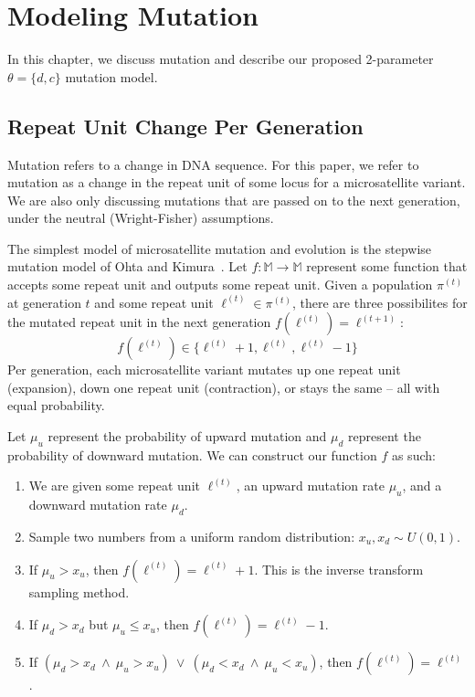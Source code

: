 \chapter{Modeling Mutation}\label{ch:modelingMutation}
In this chapter, we discuss mutation and describe our proposed 2-parameter $\theta = \{ d, c\}$ mutation model.

\section{Repeat Unit Change Per Generation}\label{sec:repeatUnitChangePerGeneration}
Mutation refers to a change in DNA sequence.
For this paper, we refer to mutation as a change in the repeat unit of some locus for a microsatellite variant.
We are also only discussing mutations that are passed on to the next generation, under the neutral (Wright-Fisher)
assumptions.

The simplest model of microsatellite mutation and evolution is the stepwise mutation
model of Ohta and Kimura~\cite{ohtaModelMutationAppropriate2007}.
Let $f : \mathbb{M} \rightarrow \mathbb{M}$ represent some function that accepts some repeat unit and outputs some
repeat unit.
Given a population $\pi^{(t)}$ at generation $t$ and some repeat unit $\ell^{(t)} \in \pi^{(t)}$, there are three
possibilites for the mutated repeat unit in the next generation $f(\ell^{(t)}) = \ell^{(t+1)}$:
\begin{equation}
    f(\ell^{(t)}) \in \{ \ell^{(t)} + 1 , \ell^{(t)}, \ell^{(t)} - 1\}
\end{equation}
Per generation, each microsatellite variant mutates up one repeat unit (expansion), down one repeat unit
(contraction), or stays the same -- all with equal probability.

Let $\mu_u$ represent the probability of upward mutation and $\mu_d$ represent the probability of downward mutation.
We can construct our function $f$ as such:
\begin{enumerate}
    \item We are given some repeat unit $\ell^{(t)}$, an upward mutation rate $\mu_u$, and a
        downward mutation rate $\mu_d$.
    \item Sample two numbers from a uniform random distribution: $x_u, x_d \sim U(0, 1)$.
    \item If $\mu_u > x_u$, then $f(\ell^{(t)}) = \ell^{(t)} + 1$.
        This is the inverse transform sampling method. \label{enum:um}
    \item If $\mu_d > x_d$ but $\mu_u \leq x_u$, then $f(\ell^{(t)}) = \ell^{(t)} - 1$. \label{enum:dm}
    \item If $(\mu_d > x_d \ \land \ \mu_u > x_u) \ \lor \ (\mu_d < x_d \ \land \ \mu_u < x_u)$, then
        $f(\ell^{(t)}) = \ell^{(t)}$.
\end{enumerate}

